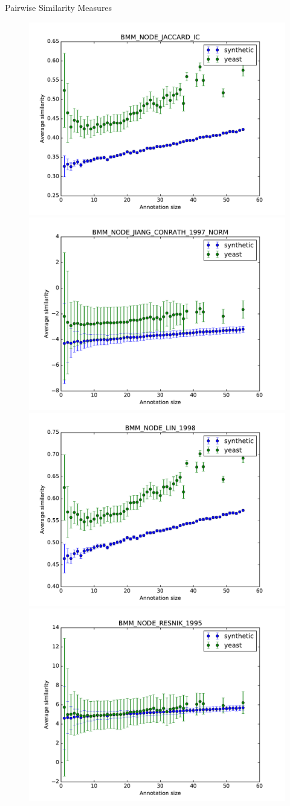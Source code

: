 \documentclass{beamer}
\begin{document}
\begin{frame}{Pairwise Similarity Measures}
\begin{figure}
\includegraphics[width=0.5\linewidth, height=0.4\textheight]{pairwise/SIM_GROUPWISE_BMM_SIM_PAIRWISE_DAG_NODE_JACCARD_IC_avg.pdf}
\includegraphics[width=0.5\linewidth, height=0.4\textheight]{pairwise/SIM_GROUPWISE_BMM_SIM_PAIRWISE_DAG_NODE_JIANG_CONRATH_1997_NORM_avg.pdf} \\
\includegraphics[width=0.5\linewidth, height=0.4\textheight]{pairwise/SIM_GROUPWISE_BMM_SIM_PAIRWISE_DAG_NODE_LIN_1998_avg.pdf}
\includegraphics[width=0.5\linewidth, height=0.4\textheight]{pairwise/SIM_GROUPWISE_BMM_SIM_PAIRWISE_DAG_NODE_RESNIK_1995_avg.pdf}
\end{figure}
\end{frame}
\end{document}
